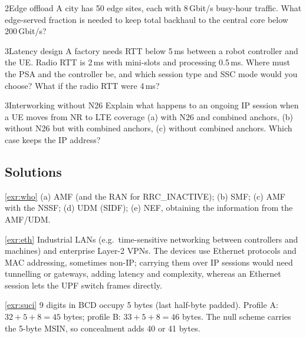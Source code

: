 \documentclass[11pt,a4paper]{article}
\begin{document}
\begin{exercisebox}{2}{Edge offload}\label{exr:offload}
A city has 50 edge sites, each with 8\,Gbit/s busy-hour traffic. What edge-served fraction is needed to keep total backhaul to the
central core below 200\,Gbit/s?
\end{exercisebox}

\begin{exercisebox}{3}{Latency design}\label{exr:latency}
A factory needs RTT below 5\,ms between a robot controller and the UE. Radio RTT is 2\,ms with mini-slots and processing 0.5\,ms. Where must
the PSA and the controller be, and which session type and SSC mode would you choose? What if the radio RTT were 4\,ms?
\end{exercisebox}

\begin{exercisebox}{3}{Interworking without N26}\label{exr:n26}
Explain what happens to an ongoing IP session when a UE moves from NR to LTE coverage (a) with N26 and combined anchors, (b) without
N26 but with combined anchors, (c) without combined anchors. Which case keeps the IP address?
\end{exercisebox}

\subsection*{Solutions}

\begin{solutionbox}{\ref{exr:who}}
(a) AMF (and the RAN for RRC\_INACTIVE); (b) SMF; (c) AMF with the NSSF; (d) UDM (SIDF); (e) NEF, obtaining the information from the AMF/UDM.
\end{solutionbox}

\begin{solutionbox}{\ref{exr:eth}}
Industrial LANs (e.g.\ time-sensitive networking between controllers and machines) and enterprise Layer-2 VPNs. The devices use Ethernet
protocols and MAC addressing, sometimes non-IP; carrying them over IP sessions would need tunnelling or gateways, adding latency and
complexity, whereas an Ethernet session lets the UPF switch frames directly.
\end{solutionbox}

\begin{solutionbox}{\ref{exr:suci}}
9 digits in BCD occupy 5 bytes (last half-byte padded). Profile A: $32 + 5 + 8 = 45$ bytes; profile B: $33 + 5 + 8 = 46$ bytes. The null scheme
carries the 5-byte MSIN, so concealment adds 40 or 41 bytes.
\end{solutionbox}
\end{document}
